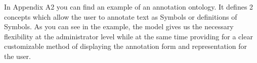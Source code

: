 In Appendix A2 you can find an example of an annotation ontology. It defines 2 concepts
which allow the user to annotate text as Symbols or definitions of Symbols. As you can see
in the example, the model gives us the necessary flexibility at the administrator level
while at the same time providing for a clear customizable method of displaying the
annotation form and representation for the user.


